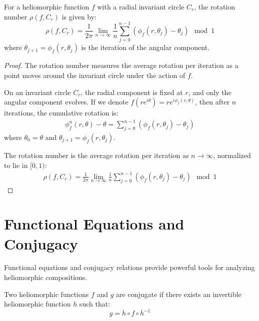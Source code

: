 \begin{theorem}
For a heliomorphic function $f$ with a radial invariant circle $C_r$, the rotation number $\rho(f, C_r)$ is given by:
\begin{equation}
\rho(f, C_r) = \frac{1}{2\pi}\lim_{n\to\infty}\frac{1}{n}\sum_{j=0}^{n-1}(\phi_f(r, \theta_j) - \theta_j) \mod 1
\end{equation}
where $\theta_{j+1} = \phi_f(r, \theta_j)$ is the iteration of the angular component.
\end{theorem}

\begin{proof}
The rotation number measures the average rotation per iteration as a point moves around the invariant circle under the action of $f$.

On an invariant circle $C_r$, the radial component is fixed at $r$, and only the angular component evolves. If we denote $f(re^{i\theta}) = re^{i\phi_f(r,\theta)}$, then after $n$ iterations, the cumulative rotation is:
\begin{align}
\phi_f^n(r,\theta) - \theta = \sum_{j=0}^{n-1}(\phi_f(r, \theta_j) - \theta_j)
\end{align}
where $\theta_0 = \theta$ and $\theta_{j+1} = \phi_f(r, \theta_j)$.

The rotation number is the average rotation per iteration as $n \to \infty$, normalized to lie in $[0, 1)$:
\begin{align}
\rho(f, C_r) = \frac{1}{2\pi}\lim_{n\to\infty}\frac{1}{n}\sum_{j=0}^{n-1}(\phi_f(r, \theta_j) - \theta_j) \mod 1
\end{align}
\end{proof}

\section{Functional Equations and Conjugacy}

Functional equations and conjugacy relations provide powerful tools for analyzing heliomorphic compositions.

\begin{definition}
Two heliomorphic functions $f$ and $g$ are conjugate if there exists an invertible heliomorphic function $h$ such that:
\begin{equation}
g = h \circ f \circ h^{-1}
\end{equation}
\end{definition}

